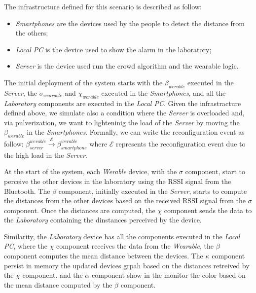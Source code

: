 \documentclass[conference]{IEEEtran}
\begin{document}
The infrastructure defined for this scenario is described as follow:

\begin{itemize}
    \item \emph{Smartphones} are the devices used by the people to detect the distance from the others;
    \item \emph{Local PC} is the device used to show the alarm in the laboratory;
    \item \emph{Server} is the device used run the crowd algorithm and the wearable logic. 
\end{itemize}

The initial deployment of the system starts with the $\beta_{werable}$ executed in the \emph{Server},
the $\sigma_{wearable}$ and $\chi_{werable}$ executed in the \emph{Smartphones},
and all the \emph{Laboratory} components are executed in the \emph{Local PC}.
%
Given the infrastracture defined above, we simulate also a condition where the \emph{Server} is overloaded and, via pulverization,
we want to lighteninig the load of the \emph{Server} by moving the $\beta_{werable}$ in the \emph{Smartphones}.
%
Formally, we can write the reconfiguration event as follow: $\beta^{werable}_{server} \xrightarrow{\mathcal{E}} \beta^{werable}_{smartphone}$
where $\mathcal{E}$ represents the reconfiguration event due to the high load in the \emph{Server}.

At the start of the system, each \emph{Werable} device, with the $\sigma$ component,
start to perceive the other devices in the laboratory using the RSSI signal from the Bluetooth.
%
The $\beta$ component, initially executed in the \emph{Server}, starts to compute the distances from the other devices
based on the received RSSI signal from the $\sigma$ component.
%
Once the distances are computed, the $\chi$ component sends the data to the
\emph{Laboratory} containing the dinstances perceived by the device.
%

Similarity, the \emph{Laboratory} device has all the components executed in the \emph{Local PC},
where the $\chi$ component receives the data from the \emph{Wearable},
the $\beta$ component computes the mean distance between the devices.
%
The $\kappa$ component persist in memory the updated devices grpah based on the distances retreived by the $\chi$ component.
and the $\alpha$ component show in the monitor the color based on the mean distance computed by the $\beta$ component.
\end{document}
